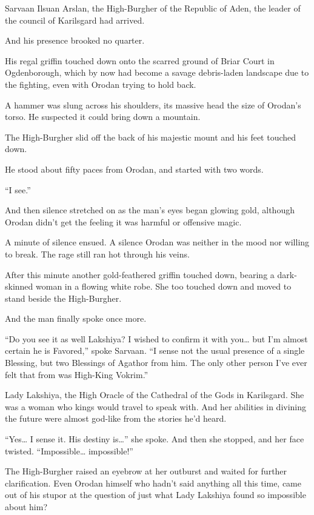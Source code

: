 \documentclass[a4paper,10pt]{book}
\begin{document}
Sarvaan Ilsuan Arslan, the High-Burgher of the Republic of Aden, the leader of the council of Karilsgard had arrived.\par
And his presence brooked no quarter.\par
His regal griffin touched down onto the scarred ground of Briar Court in Ogdenborough, which by now had become a savage debris-laden landscape due to the fighting, even with Orodan trying to hold back.\par
A hammer was slung across his shoulders, its massive head the size of Orodan’s torso. He suspected it could bring down a mountain.\par
The High-Burgher slid off the back of his majestic mount and his feet touched down.\par
He stood about fifty paces from Orodan, and started with two words.\par
“I see.”\par
And then silence stretched on as the man’s eyes began glowing gold, although Orodan didn’t get the feeling it was harmful or offensive magic.\par
A minute of silence ensued. A silence Orodan was neither in the mood nor willing to break. The rage still ran hot through his veins.\par
After this minute another gold-feathered griffin touched down, bearing a dark-skinned woman in a flowing white robe. She too touched down and moved to stand beside the High-Burgher.\par
And the man finally spoke once more.\par
“Do you see it as well Lakshiya? I wished to confirm it with you… but I’m almost certain he is Favored,” spoke Sarvaan. “I sense not the usual presence of a single Blessing, but two Blessings of Agathor from him. The only other person I’ve ever felt that from was High-King Vokrim.”\par
Lady Lakshiya, the High Oracle of the Cathedral of the Gods in Karilsgard. She was a woman who kings would travel to speak with. And her abilities in divining the future were almost god-like from the stories he’d heard.\par
“Yes… I sense it. His destiny is…” she spoke. And then she stopped, and her face twisted. “Impossible… impossible!”\par
The High-Burgher raised an eyebrow at her outburst and waited for further clarification. Even Orodan himself who hadn’t said anything all this time, came out of his stupor at the question of just what Lady Lakshiya found so impossible about him?\par
\end{document}
